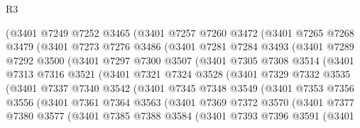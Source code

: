 \begin{lexlean}{R3}
\begin{coremodule}
        (@3401
          @7249
          @7252
          @3465
          (@3401
            @7257
            @7260
            @3472
            (@3401
              @7265
              @7268
              @3479
              (@3401
                @7273
                @7276
                @3486
                (@3401
                  @7281
                  @7284
                  @3493
                  (@3401
                    @7289
                    @7292
                    @3500
                    (@3401
                      @7297
                      @7300
                      @3507
                      (@3401
                        @7305
                        @7308
                        @3514
                        (@3401
                          @7313
                          @7316
                          @3521
                          (@3401
                            @7321
                            @7324
                            @3528
                            (@3401
                              @7329
                              @7332
                              @3535
                              (@3401
                                @7337
                                @7340
                                @3542
                                (@3401
                                  @7345
                                  @7348
                                  @3549
                                  (@3401
                                    @7353
                                    @7356
                                    @3556
                                    (@3401
                                      @7361
                                      @7364
                                      @3563
                                      (@3401
                                        @7369
                                        @7372
                                        @3570
                                        (@3401
                                          @7377
                                          @7380
                                          @3577
                                          (@3401
                                            @7385
                                            @7388
                                            @3584
                                            (@3401
                                              @7393
                                              @7396
                                              @3591
                                              (@3401

\end{coremodule}
\end{lexlean}
